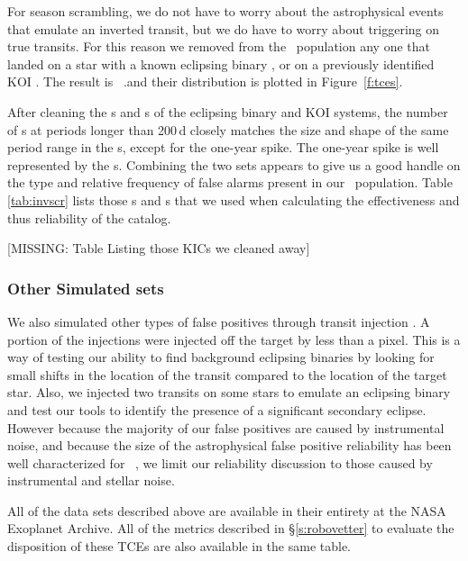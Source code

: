For season scrambling, we do not have to worry about the astrophysical events that emulate an inverted transit, but we do have to worry about triggering on true transits. For this reason we removed from the \scrtce\ population any one that landed on a star with a known eclipsing binary \citep{Kirk2016}, or on a previously identified KOI \citep{Coughlin2016}.  The result is \nscrtces\ \scrtce.and their distribution is plotted in Figure~\ref{f:tces}. 

After cleaning the \invtce s and \scrtce s of the eclipsing binary and KOI systems, the number of \scrtce s at periods longer than 200\,d closely matches the size and shape of the same period range in the \opstce s, except for the one-year spike.  The one-year spike is well represented by the \invtce s.  Combining the two sets appears to give us a good handle on the type and relative frequency of false alarms present in our \opstce\ population. Table\,\ref{tab:invscr} lists those \invtce s and \sctce s that we used when calculating the effectiveness and thus reliability of the catalog.


[MISSING: Table Listing those KICs we cleaned away]

\subsubsection{Other Simulated sets}
We also simulated other types of false positives through transit injection \citep{Christiansen2017}. A portion of the injections were injected off the target by less than a pixel.  This is a way of testing our ability to find background eclipsing binaries by looking for small shifts in the location of the transit compared to the location of the target star.  Also, we injected two transits on some stars to emulate an eclipsing binary and test our tools to identify the presence of a significant secondary eclipse.  However because the majority of our false positives are caused by instrumental noise, and because the size of the astrophysical false positive reliability has been well characterized for \Kepler\ \citep[e.g.][]{Morton2016}, we limit our reliability discussion to those caused by instrumental and stellar noise. 


All of the data sets described above are available in their entirety at the NASA Exoplanet Archive.  All of the metrics described in \S\ref{s:robovetter} to evaluate the disposition of these TCEs are also available in the same table. 
